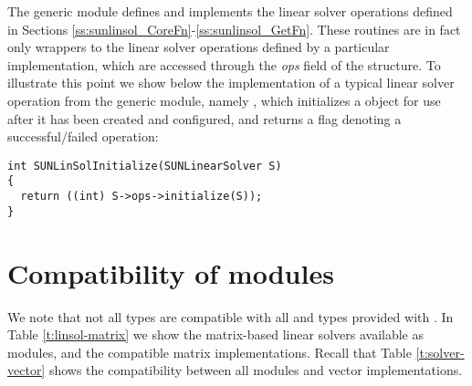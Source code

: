 The generic {\sunlinsol} module defines and implements the linear
solver operations defined in Sections
\ref{ss:sunlinsol_CoreFn}-\ref{ss:sunlinsol_GetFn}.  These routines
are in fact only wrappers to the linear solver operations
defined by a particular {\sunlinsol} implementation, which are
accessed through the {\em ops} field of the 
structure. To illustrate this point we show below the implementation
of a typical linear solver operation from the generic {\sunlinsol}
module, namely , which initializes a
{\sunlinsol} object for use after it has been created and configured,
and returns a flag denoting a successful/failed operation:
\begin{verbatim}
int SUNLinSolInitialize(SUNLinearSolver S)
{
  return ((int) S->ops->initialize(S));
}
\end{verbatim}


\section{Compatibility of  modules}\label{ss:sunlinsol_compatibility}


We note that not all {\sunlinsol} types are compatible with all
{\sunmatrix} and {\nvector} types provided with {\sundials}.  In Table
\ref{t:linsol-matrix} we show the matrix-based linear solvers
available as {\sunlinsol} modules, and the compatible matrix
implementations.  Recall that Table \ref{t:solver-vector} shows the
compatibility between all {\sunlinsol} modules and vector
implementations.

